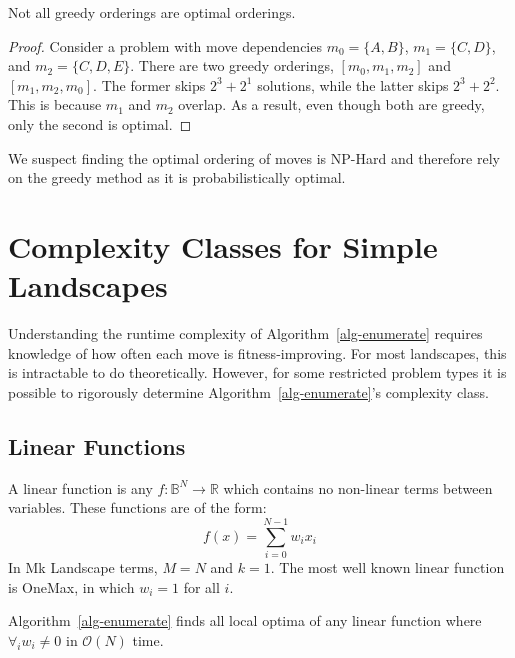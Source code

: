 \documentclass[runningheads,a4paper]{llncs}
\newcommand{\BigO}[1]{$\mathcal{O}{(#1)}$}
\begin{document}
\begin{theorem}
Not all greedy orderings are optimal orderings.
\end{theorem}

\begin{proof}
Consider a problem with move dependencies $m_0 = \{A, B\}$, $m_1 = \{C, D\}$, and $m_2 = \{C, D, E\}$.
There are two greedy orderings, $[m_0, m_1, m_2]$ and $[m_1, m_2, m_0]$. The former
skips $2^3+2^1$ solutions, while the latter skips $2^3+2^2$. This is because $m_1$ and
$m_2$ overlap. As a result, even though both are greedy, only the second is optimal.
\end{proof}

We suspect finding the optimal ordering of moves is NP-Hard and therefore rely on
the greedy method as it is probabilistically optimal.

\section{Complexity Classes for Simple Landscapes}
Understanding the runtime complexity of Algorithm~\ref{alg-enumerate} requires
knowledge of how often each move is fitness-improving. For most landscapes,
this is intractable to do theoretically. However, for some restricted problem
types it is possible to rigorously determine Algorithm~\ref{alg-enumerate}'s complexity class.

\subsection{Linear Functions}
A linear function is any $f : \mathbb{B}^{N}\rightarrow \mathbb{R}$ which contains
no non-linear terms between variables. These functions are of the form:
\begin{equation}
  f(x) = \sum_{i=0}^{N-1} w_ix_i
  \label{eq-linear}
\end{equation}
In Mk Landscape terms, $M=N$ and $k=1$. The most well known linear function is OneMax,
in which $w_i=1$ for all $i$.

\begin{theorem}
Algorithm~\ref{alg-enumerate} finds all local optima of any linear function
where $\forall_i w_i \neq 0$ in \BigO{N} time.
\end{theorem}
\end{document}
